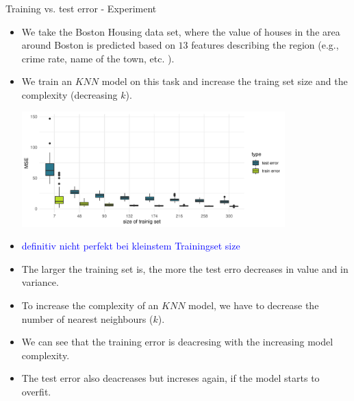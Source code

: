 \documentclass[11pt,compress,t,notes=noshow, xcolor=table]{beamer}
\begin{document}
\begin{vbframe}{Training vs. test error - Experiment}

\begin{itemize}
\small
\item We take the Boston Housing data set, where the value of houses in the area around Boston is predicted based on $13$ features describing the region (e.g., crime rate, name of the town, etc. ).

\item We train an $KNN$ model on this task and increase the traing set size and the complexity (decreasing $k$). 

\begin{center}
\includegraphics[width=0.8\textwidth]{figure/fig-train-vs-test-error-1}
\end{center}

\item \textcolor{blue}{definitiv nicht perfekt bei kleinstem Trainingset size}
\item The larger the training set is,  the more the test erro 
decreases in value and in variance. 

\end{itemize}



\framebreak

\begin{itemize}

\item To increase the complexity of an $KNN$ model, we have to decrease the number of nearest neighbours ($k$).

\item We can see that the training error is deacresing with the increasing model complexity. 

\item The test error also deacreases but increses again, if the model starts to overfit.

\end{itemize}


\end{vbframe}
\end{document}
